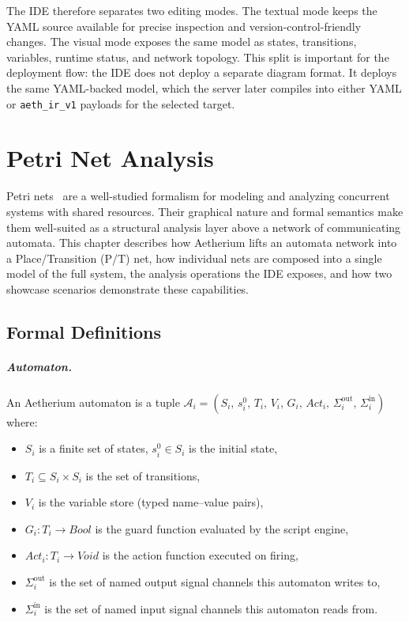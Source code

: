 The IDE therefore separates two editing modes. The textual mode keeps the YAML source available for precise inspection and version-control-friendly changes. The visual mode exposes the same model as states, transitions, variables, runtime status, and network topology. This split is important for the deployment flow: the IDE does not deploy a separate diagram format. It deploys the same YAML-backed model, which the server later compiles into either YAML or \texttt{aeth\_ir\_v1} payloads for the selected target.

\chapter{Petri Net Analysis}
\label{chap:petri}

Petri nets~\cite{Murata1989} are a well-studied formalism for modeling and analyzing concurrent systems with shared resources. Their graphical nature and formal semantics make them well-suited as a structural analysis layer above a network of communicating automata. This chapter describes how Aetherium lifts an automata network into a Place/Transition (P/T) net, how individual nets are composed into a single model of the full system, the analysis operations the IDE exposes, and how two showcase scenarios demonstrate these capabilities.

\section{Formal Definitions}
\label{sec:petri-formal}

\paragraph{Automaton.}
An Aetherium automaton is a tuple $\mathcal{A}_i = (S_i,\, s^0_i,\, T_i,\, V_i,\, G_i,\, \mathit{Act}_i,\, \Sigma^{\mathrm{out}}_i,\, \Sigma^{\mathrm{in}}_i)$ where:
\begin{itemize}
  \item $S_i$ is a finite set of states, $s^0_i \in S_i$ is the initial state,
  \item $T_i \subseteq S_i \times S_i$ is the set of transitions,
  \item $V_i$ is the variable store (typed name--value pairs),
  \item $G_i : T_i \to \mathit{Bool}$ is the guard function evaluated by the script engine,
  \item $\mathit{Act}_i : T_i \to \mathit{Void}$ is the action function executed on firing,
  \item $\Sigma^{\mathrm{out}}_i$ is the set of named output signal channels this automaton writes to,
  \item $\Sigma^{\mathrm{in}}_i$ is the set of named input signal channels this automaton reads from.
\end{itemize}

